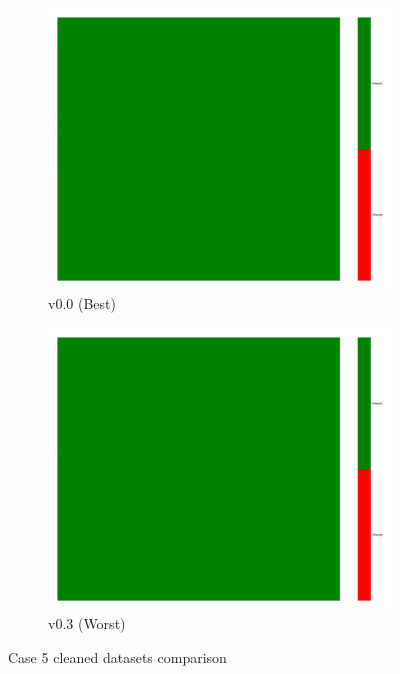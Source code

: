 \documentclass[a4paper,12pt]{article}
\begin{document}
\begin{figure}[H]
    \centering
    \begin{subfigure}{0.45\textwidth}
        \includegraphics[width=\linewidth]{case5_v0.0_heatmap_cleaned.png}
        \caption{v0.0 (Best)}
    \end{subfigure}
    \hfill
    \begin{subfigure}{0.45\textwidth}
        \includegraphics[width=\linewidth]{case5_v0.3_heatmap_cleaned.png}
        \caption{v0.3 (Worst)}
    \end{subfigure}
    \caption{Case 5 cleaned datasets comparison}
\end{figure}
\end{document}
